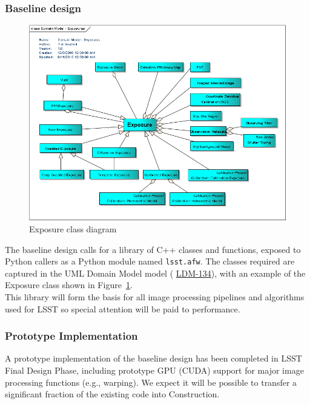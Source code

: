 \documentclass[12pt]{article}
\newcommand{\ds}[2]{{\color{blue} \href{https://docushare.lsstcorp.org/docushare/dsweb/Get/#1}{#2}}\xspace}
\newcommand{\appsUML}{\ds{LDM-134}{LDM-134}}
\begin{document}
\subsubsection{Baseline design}

\begin{figure}
\includegraphics[angle=0,scale=0.54]{domain_model_-_exposures.png}
\caption{Exposure class diagram\label{fig:exposureUML}}
\end{figure}

The baseline design calls for a library of C++ classes and functions, exposed to Python callers as a Python module named {\tt lsst.afw}. The classes required are captured in the UML Domain Model model (\appsUML), with an example of the Exposure class shown in Figure~\ref{fig:exposureUML}.
\\

This library will form the basis for all image processing pipelines and algorithms used for LSST so special attention will be paid to performance.


\subsubsection{Prototype Implementation}

A prototype implementation of the baseline design has been completed in LSST Final Design Phase, including prototype GPU (CUDA) support for major image processing functions (e.g., warping). We expect it will be possible to transfer a significant fraction of the existing code into Construction.
\\
\end{document}
